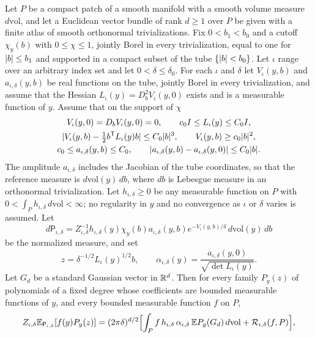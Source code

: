 \begin{lemma}\label{ch27:lem:uniform-tube-laplace}
Let $P$ be a compact patch of a smooth manifold with a smooth volume measure $d\mathrm{vol}$, and let a Euclidean vector bundle of rank $d\ge1$ over $P$ be given with a finite atlas of smooth orthonormal trivializations. Fix $0<b_1<b_0$ and a cutoff $\chi_y(b)$ with $0\le\chi\le1$, jointly Borel in every trivialization, equal to one for $\lvert b\rvert\le b_1$ and supported in a compact subset of the tube $\{\lvert b\rvert<b_0\}$. Let $\iota$ range over an arbitrary index set and let $0<\delta\le\delta_0$. For each $\iota$ and $\delta$ let $V_\iota(y,b)$ and $a_{\iota,\delta}(y,b)$ be real functions on the tube, jointly Borel in every trivialization, and assume that the Hessian $L_\iota(y)=D_b^2V_\iota(y,0)$ exists and is a measurable function of $y$. Assume that on the support of $\chi$
\begin{gather*}
 V_\iota(y,0)=D_bV_\iota(y,0)=0,\qquad c_0I\le L_\iota(y)\le C_0I,\\
 \lvert V_\iota(y,b)-\tfrac12b^{\mathsf T}L_\iota(y)b\rvert\le C_0\lvert b\rvert^3,\qquad V_\iota(y,b)\ge c_0\lvert b\rvert^2,\\
 c_0\le a_{\iota,\delta}(y,b)\le C_0,\qquad\lvert a_{\iota,\delta}(y,b)-a_{\iota,\delta}(y,0)\rvert\le C_0\lvert b\rvert.
\end{gather*}
The amplitude $a_{\iota,\delta}$ includes the Jacobian of the tube coordinates, so that the reference measure is $d\mathrm{vol}(y)\,db$, where $db$ is Lebesgue measure in an orthonormal trivialization. Let $h_{\iota,\delta}\ge0$ be any measurable function on $P$ with $0<\int_Ph_{\iota,\delta}\,d\mathrm{vol}<\infty$; no regularity in $y$ and no convergence as $\iota$ or $\delta$ varies is assumed. Let
\[
 d\mathsf P_{\iota,\delta}=Z_{\iota,\delta}^{-1}h_{\iota,\delta}(y)\chi_y(b)a_{\iota,\delta}(y,b)e^{-V_\iota(y,b)/\delta}\,d\mathrm{vol}(y)\,db
\]
be the normalized measure, and set
\[
 z=\delta^{-1/2}L_\iota(y)^{1/2}b,\qquad\alpha_{\iota,\delta}(y)=\frac{a_{\iota,\delta}(y,0)}{\sqrt{\det L_\iota(y)}}.
\]
Let $G_d$ be a standard Gaussian vector in $\mathbb R^d$. Then for every family $P_y(z)$ of polynomials of a fixed degree whose coefficients are bounded measurable functions of $y$, and every bounded measurable function $f$ on $P$,
\begin{equation}\label{ch27:eq:global-laplace}
\begin{gathered}
 Z_{\iota,\delta}\E_{\mathsf P_{\iota,\delta}}[f(y)P_y(z)]=(2\pi\delta)^{d/2}\Bigl[\int_Pf\,h_{\iota,\delta}\,\alpha_{\iota,\delta}\,\E P_y(G_d)\,d\mathrm{vol}+\mathcal R_{\iota,\delta}(f,P)\Bigr],\\

\end{gathered}
\end{equation}
\end{lemma}
